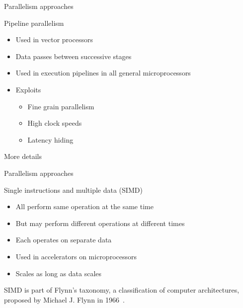 \documentclass[12pt,t]{beamer}
\begin{document}
\begin{frame}{Parallelism approaches}

\begin{block}{Pipeline parallelism }
\begin{itemize}
\item Used in vector processors
\item Data passes between successive stages
\item Used in execution pipelines in all general microprocessors
\item Exploits
\begin{itemize}
\item Fine grain parallelism 
\item High clock speeds
\item Latency hiding
\end{itemize}
\end{itemize}
\end{block}


More details~\cite{0072822562}
\end{frame}


\begin{frame}{Parallelism approaches}

\begin{block}{Single instructions and multiple data (SIMD)}
\begin{itemize}
\item All perform same operation at the same time
\item But may perform different operations at different times
\item Each operates on separate data
\item Used in accelerators on microprocessors
\item Scales as long as data scales
\end{itemize}
\end{block}

SIMD is part of Flynn's taxonomy, a classification of computer architectures, proposed by Michael J. Flynn in 1966~\cite{flynn1972some,duncan1990survey}.
\end{frame}
\end{document}
